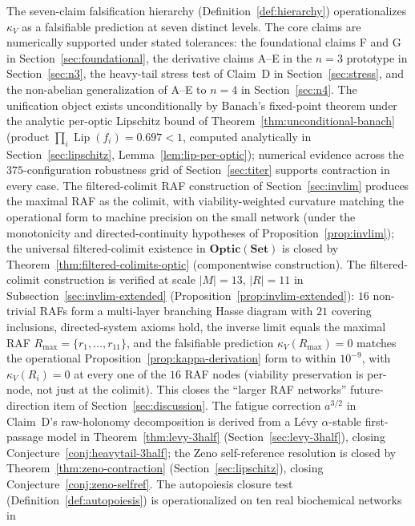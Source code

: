 \documentclass[11pt,a4paper]{article}
\theoremstyle{plain}
\theoremstyle{definition}
\theoremstyle{remark}
\newcommand{\kk}{\kappa_{\!V}}
\newcommand{\Optic}{\mathbf{Optic}}
\DeclareMathOperator{\Lip}{Lip}
\begin{document}
The seven-claim falsification hierarchy
(Definition~\ref{def:hierarchy}) operationalizes $\kk$ as a falsifiable
prediction at seven distinct levels. The core claims are numerically
supported under stated tolerances: the foundational claims F and G in
Section~\ref{sec:foundational}, the derivative claims A--E in the
$n=3$ prototype in Section~\ref{sec:n3}, the heavy-tail stress test of
Claim~D in Section~\ref{sec:stress}, and the non-abelian
generalization of A--E to $n=4$ in Section~\ref{sec:n4}. The
unification object exists unconditionally by Banach's fixed-point
theorem under the analytic per-optic Lipschitz bound of
Theorem~\ref{thm:unconditional-banach} (product
$\prod_{i}\Lip(f_{i})=0.697<1$, computed analytically in
Section~\ref{sec:lipschitz}, Lemma~\ref{lem:lip-per-optic}); numerical
evidence across the $375$-configuration robustness grid of
Section~\ref{sec:titer} supports contraction in every case. The
filtered-colimit RAF construction of Section~\ref{sec:invlim} produces
the maximal RAF as the colimit, with viability-weighted curvature
matching the operational form to machine precision on the small
network (under the monotonicity and directed-continuity hypotheses of
Proposition~\ref{prop:invlim}); the universal filtered-colimit
existence in $\Optic(\mathbf{Set})$ is closed by
Theorem~\ref{thm:filtered-colimits-optic} (componentwise construction).
The filtered-colimit construction is verified at scale
$|M|=13$, $|R|=11$ in Subsection~\ref{sec:invlim-extended}
(Proposition~\ref{prop:invlim-extended}): $16$ non-trivial RAFs form
a multi-layer branching Hasse diagram with $21$ covering inclusions,
directed-system axioms hold, the inverse limit equals the maximal
RAF $R_{\max}=\{r_1,\ldots,r_{11}\}$, and the falsifiable prediction
$\kk(R_{\max})=0$ matches the operational Proposition~\ref{prop:kappa-derivation} form to within
$10^{-9}$, with $\kk(R_i)=0$ at every one of the $16$ RAF nodes
(viability preservation is per-node, not just at the colimit). This
closes the ``larger RAF networks'' future-direction item of
Section~\ref{sec:discussion}.
The fatigue correction $a^{3/2}$ in Claim~D's raw-holonomy
decomposition is derived from a L\'evy $\alpha$-stable first-passage
model in Theorem~\ref{thm:levy-3half} (Section~\ref{sec:levy-3half}),
closing Conjecture~\ref{conj:heavytail-3half}; the Zeno self-reference
resolution is closed by Theorem~\ref{thm:zeno-contraction}
(Section~\ref{sec:lipschitz}), closing Conjecture~\ref{conj:zeno-selfref}.
The autopoiesis closure test (Definition~\ref{def:autopoiesis}) is
operationalized on ten real biochemical networks in
\end{document}
